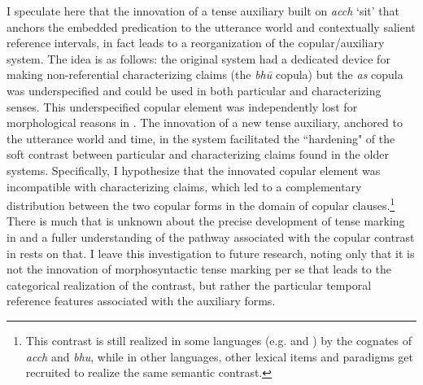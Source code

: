 \documentclass[output=paper,hidelinks]{langscibook}
\begin{document}
\begin{exe}
\begin{xlist}
\begin{xlist}
\begin{exe}
\begin{exe}
\begin{exe}
\begin{exe}
\begin{xlist}
\begin{exe}
\begin{xlist}
\begin{exe}
\begin{xlist}
I speculate here that the  innovation of a tense auxiliary built on \textit{acch} `sit' that anchors the embedded predication to the utterance world and contextually salient reference intervals, in fact leads to a reorganization of the copular/auxiliary system. The idea is as follows: the original  system had a dedicated device for making non-referential characterizing claims (the \emph{bh\={u}} copula) but the \textit{as} copula was underspecified and could be used in both particular and characterizing senses. This underspecified copular element was independently lost for morphological reasons in . The innovation of a new tense auxiliary, anchored to the utterance world and time, in the  system facilitated the ``hardening" of the soft contrast between particular and characterizing claims found in the older systems. Specifically, I hypothesize that the innovated copular element was incompatible with characterizing claims, which led to a complementary distribution between the two copular forms in the domain of copular clauses.\footnote{This contrast is still realized in some languages (e.g.  and ) by the cognates of \textit{acch} and \textit{bhu}, while in other languages, other lexical items and paradigms get recruited to realize the same semantic contrast.} There is much that is unknown about the precise development of tense marking in  and a fuller understanding of the pathway associated with the copular contrast in  rests on that. I leave this investigation to future research, noting only that it is not the innovation of morphosyntactic tense marking per se that leads to the categorical realization of the contrast, but rather the particular temporal reference features associated with the auxiliary forms.



\end{xlist}
\end{exe}
\end{xlist}
\end{exe}
\end{xlist}
\end{exe}
\end{exe}
\end{exe}
\end{exe}
\end{xlist}
\end{xlist}
\end{exe}
\end{document}
